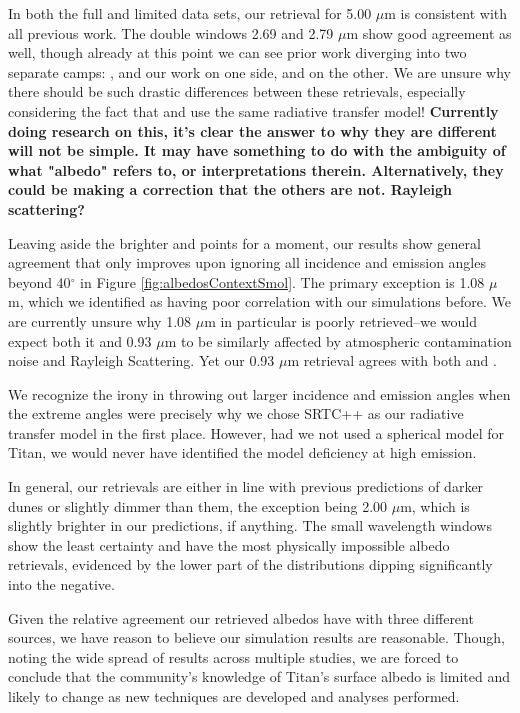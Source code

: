 \documentclass[twocolumn,linenumbers]{aastex631}
\begin{document}
In both the full and limited data sets, our retrieval for 5.00 $\mu$m is consistent with all previous work. The double windows 2.69 and 2.79 $\mu$m show good agreement as well, though already at this point we can see prior work diverging into two separate camps: \cite{McCord2006, Solomonidou2018, EsSayeh2023}, and our work on one side, \cite{Bonnefoy2016} and \cite{Brossier2018} on the other. We are unsure why there should be such drastic differences between these retrievals, especially considering the fact that \cite{Solomonidou2018} and \cite{Brossier2018} use the same radiative transfer model! \textbf{\color{red}Currently doing research on this, it's clear the answer to why they are different will not be simple. It may have something to do with the ambiguity of what "albedo" refers to, or interpretations therein. Alternatively, they could be making a correction that the others are not. Rayleigh scattering?\color{black}}

Leaving aside the brighter \cite{Bonnefoy2016} and \cite{Brossier2018} points for a moment, our results show general agreement that only improves upon ignoring all incidence and emission angles beyond 40$^{\circ}$ in Figure \ref{fig:albedosContextSmol}. The primary exception is 1.08 $\mu$m, which we identified as having poor correlation with our simulations before. We are currently unsure why 1.08 $\mu$m in particular is poorly retrieved--we would expect both it and 0.93 $\mu$m to be similarly affected by atmospheric contamination noise and Rayleigh Scattering. Yet our 0.93 $\mu$m retrieval agrees with both \cite{McCord2006} and \cite{EsSayeh2023}.

We recognize the irony in throwing out larger incidence and emission angles when the extreme angles were precisely why we chose SRTC++ as our radiative transfer model in the first place. However, had we not used a spherical model for Titan, we would never have identified the model deficiency at high emission. 

In general, our retrievals are either in line with previous predictions of darker dunes or slightly dimmer than them, the exception being 2.00 $\mu$m, which is slightly brighter in our predictions, if anything. The small wavelength windows show the least certainty and have the most physically impossible albedo retrievals, evidenced by the lower part of the distributions dipping significantly into the negative.

Given the relative agreement our retrieved albedos have with three different sources, we have reason to believe our simulation results are reasonable. Though, noting the wide spread of results across multiple studies, we are forced to conclude that the community's knowledge of Titan's surface albedo is limited and likely to change as new techniques are developed and analyses performed.
\end{document}
